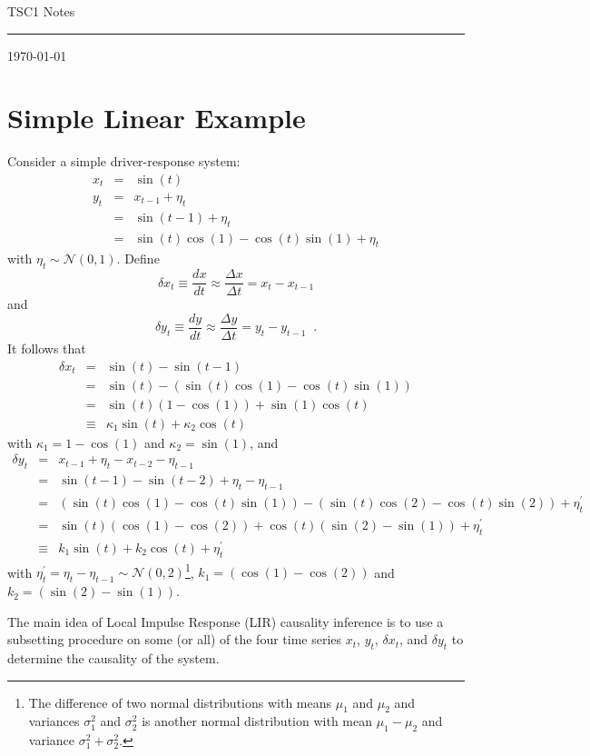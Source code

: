 \documentclass[a4paper,11pt]{article}
\begin{document}
{\Huge TSC1 Notes}

\hfill\rule{150mm}{.1pt}

\hfill{\small \today}

\section{Simple Linear Example}
Consider a simple driver-response system:
\begin{eqnarray*}
x_t &=& \sin(t)\\
y_t &=& x_{t-1} + \eta_t\\
&=& \sin(t-1) + \eta_t\\
&=& \sin(t)\cos(1)-\cos(t)\sin(1)+ \eta_t
\end{eqnarray*}
with $\eta_t\sim \mathcal{N}(0,1)$.  Define
$$
\delta x_t \equiv \frac{dx}{dt} \approx \frac{\Delta x}{\Delta t} = x_t-x_{t-1}
$$
and
$$
\delta y_t \equiv \frac{dy}{dt} \approx \frac{\Delta y}{\Delta t} = y_t-y_{t-1}\;\;.
$$
It follows that
\begin{eqnarray*}
\delta x_t &=& \sin(t)-\sin(t-1)\\
&=& \sin(t)-\left(\sin(t)\cos(1)-\cos(t)\sin(1)\right)\\
&=& \sin(t)\left(1-\cos(1)\right)+\sin(1)\cos(t)\\
&\equiv& \kappa_1\sin(t)+\kappa_2\cos(t)
\end{eqnarray*}
with $\kappa_1 = 1-\cos(1)$ and $\kappa_2 = \sin(1)$, and
\begin{eqnarray*}
\delta y_t &=& x_{t-1} + \eta_t - x_{t-2} - \eta_{t-1}\\
&=& \sin(t-1) - \sin(t-2) + \eta_t - \eta_{t-1}\\
&=& \left(\sin(t)\cos(1)-\cos(t)\sin(1)\right) - \left(\sin(t)\cos(2)-\cos(t)\sin(2)\right)+\eta^\prime_t \\
&=& \sin(t)\left(\cos(1)-\cos(2)\right)+\cos(t)\left(\sin(2)-\sin(1)\right)+\eta^\prime_t\\
&\equiv& k_1\sin(t)+k_2\cos(t)+\eta^\prime_t
\end{eqnarray*}
with $\eta^\prime_t = \eta_t - \eta_{t-1} \sim \mathcal{N}(0,2)$\footnote{The difference of two normal distributions with means $\mu_1$ and $\mu_2$ and variances $\sigma^2_1$ and $\sigma^2_2$ is another normal distribution with mean $\mu_1-\mu_2$ and variance $\sigma^2_1+\sigma^2_2$.}, $k_1 = \left(\cos(1)-\cos(2)\right)$ and $k_2 = \left(\sin(2)-\sin(1)\right)$.

The main idea of Local Impulse Response (LIR) causality inference is to use a subsetting procedure on some (or all) of the four time series $x_t$, $y_t$, $\delta x_t$, and $\delta y_t$ to determine the causality of the system.
\end{document}
